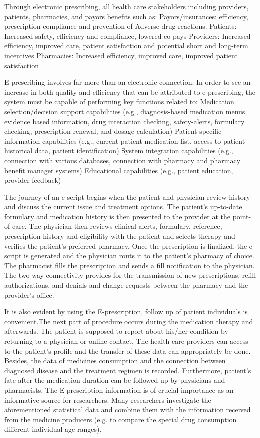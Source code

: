 \documentclass[10pt, conference, compsocconf]{IEEEtran}
\begin{document}
Through electronic prescribing, all health care stakeholders including providers, patients, pharmacies, and payors benefits such as:
Payors/insurances: efficiency, prescription compliance and prevention of Adverse drug reactions.
Patients: Increased safety, efficiency and compliance, lowered co-pays
Providers: Increased efficiency, improved care, patient satisfaction and potential short and long-term incentives
Pharmacies: Increased efficiency, improved care, improved patient satisfaction

E-prescribing involves far more than an electronic connection. In order to see an increase in both quality and efficiency that can be attributed to e-prescribing, the system must be capable of performing key functions related to:
Medication selection/decision support capabilities (e.g., diagnosis-based medication menus, evidence based information, drug interaction checking, safety-alerts, formulary checking, prescription renewal, and dosage calculation)
Patient-specific information capabilities (e.g., current patient medication list, access to patient historical data, patient identification)
System integration capabilities (e.g., connection with various databases, connection with pharmacy and pharmacy benefit manager systems)
Educational capabilities (e.g., patient education, provider feedback)

The journey of an e-script begins when the patient and physician review history and discuss the current issue and treatment options. The patient’s up-to-date formulary and medication history is then presented to the provider at the point-of-care.
The physician then reviews clinical alerts, formulary, reference, prescription history and eligibility with the patient and selects therapy and verifies the patient’s preferred pharmacy.
Once the prescription is finalized, the e-script is generated and the physician routs it to the patient’s pharmacy of choice. The pharmacist fills the prescription and sends a fill notification to the physician.
The two-way connectivity provides for the transmission of new prescriptions, refill authorizations, and denials and change requests between the pharmacy and the provider’s office.

It is also evident by using the E-prescription, follow up of patient individuals is convenient.The next part of procedure occurs during the medication therapy and afterwards. The patient is supposed to report about his/her condition by returning to a physician or online contact.
The health care providers can access to the patient's profile and the transfer of these data can appropriately be done.
Besides, the data of medicines consumption and the connection between diagnosed disease and the treatment regimen is recorded.
Furthermore, patient's fate after the medication duration can be followed up by physicians and pharmacists.
The E-prescription information is  of crucial importance as an  informative source for researchers.
Many researchers investigate the aforementioned statistical data and combine them with the information received from the medicine producers (e.g. to compare the special drug consumption different  individual age ranges).
\end{document}
